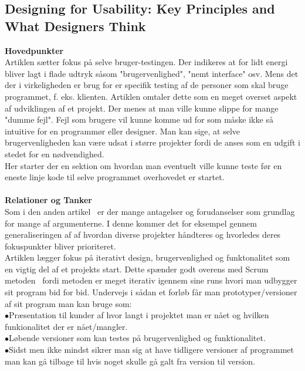 \documentclass[a4paper]{article}
\begin{document}
\subsection{Designing for Usability: Key Principles and What Designers Think}
\textbf{Hovedpunkter}\\
Artiklen sætter fokus på selve bruger-testingen. Der indikeres at for lidt energi bliver lagt i flade udtryk såsom "brugervenlighed", "nemt interface" osv. Mens det der i virkeligheden er brug for er specifik testing af de personer som skal bruge programmet, f. eks. klienten. Artiklen omtaler dette som en meget overset aspekt af udviklingen af et projekt. Der menes at man ville kunne slippe for mange "dumme fejl". Fejl som brugere vil kunne komme ud for som måske ikke så intuitive for en programmør eller designer. Man kan sige, at selve brugervenligheden kan være udsat i større projekter fordi de anses som en udgift i stedet for en nødvendighed.\\
Her starter der en sektion om hvordan man eventuelt ville kunne teste før en eneste linje kode til selve programmet overhovedet er startet.\\\\
\textbf{Relationer og Tanker}\\
Som i den anden artikel~\cite{UseDesign} er der mange antagelser og forudanselser som grundlag for mange af argumenterne. I denne kommer det for eksempel gennem generaliseringen af af hvordan diverse projekter håndteres og hvorledes deres fokuspunkter bliver prioriteret.\\
Artiklen lægger fokus på iterativt design, brugervenlighed og funktonalitet som en vigtig del af et projekts start. Dette spænder godt overens med Scrum metoden~\cite{Scrum} fordi metoden er meget iterativ igennem sine runs hvori man udbygger sit program bid for bid. Undervejs i sådan et forløb får man prototyper/versioner af sit program man kan bruge som:\\
$\bullet$Præsentation til kunder af hvor langt i projektet man er nået og hvilken funkionalitet der er nået/mangler.\\
$\bullet$Løbende versioner som kan testes på brugervenlighed og funktionalitet.\\
$\bullet$Sidst men ikke mindst sikrer man sig at have tidligere versioner af programmet man kan gå tilbage til hvis noget skulle gå galt fra version til version.
\newpage
\end{document}

